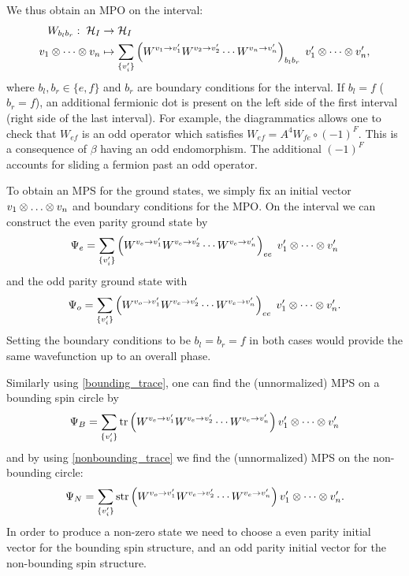 We thus obtain an MPO on the interval:
\begin{align}
W_{b_l b_r}: \; \mathcal{H}_I &\to \mathcal{H}_I\\
v_1 \otimes \cdots \otimes v_n& \mapsto  \sum_{\{v_i' \}} \left( W^{v_1 \rightarrow v_1'} W^{v_2 \rightarrow v_2'} \cdots W^{v_n \rightarrow v_n'} \right)_{b_l b_r} \; v_1' \otimes \cdots \otimes v_n' ,
\end{align}
where $b_l,b_r \in \{e,f\}$ and $b_r$ are boundary conditions for the interval.
If $b_l=f$ ($b_r=f$), an additional fermionic dot is present on the left side of the first interval (right side of the last interval). 
For example, the diagrammatics allows one to check that $W_{ef}$ is an odd operator which satisfies $W_{ef} = A^4 W_{fe} \circ (-1)^F$.
This is a consequence of $\beta$ having an odd endomorphism.
The additional $(-1)^F$ accounts for sliding a fermion past an odd operator.

To obtain an MPS for the ground states, we simply fix an initial vector $v_1\tp \dots \tp v_n$ and boundary conditions for the MPO. 
On the interval we can construct the even parity ground state by
\begin{align}
\Psi_{e} = \sum_{\{v_i' \}} \left( W^{v_e \rightarrow v_1'} W^{v_e \rightarrow v_2'} \cdots W^{v_e \rightarrow v_n'} \right)_{ee} \; v_1' \otimes \cdots \otimes v_n' 
\end{align} 
and the odd parity ground state with
\begin{align}
\Psi_{o} = \sum_{\{v_i' \}} \left( W^{v_o \rightarrow v_1'} W^{v_e \rightarrow v_2'} \cdots W^{v_e \rightarrow v_n'} \right)_{ee} \; v_1' \otimes \cdots \otimes v_n'.
\end{align} 
Setting the boundary conditions to be $b_l=b_r=f$ in both cases would provide the same wavefunction up to an overall phase.

Similarly using \eqref{bounding_trace}, one can find the (unnormalized) MPS on a bounding spin circle by
\begin{align} 
\Psi_B = \sum_{\{ v_i ' \} } \text{tr} \left( W^{v_e \rightarrow v_1'} W^{v_e \rightarrow v_2'} \cdots W^{v_e \rightarrow v_n'} \right) v_1' \otimes \cdots \otimes v_n' 
\end{align}
and by using \eqref{nonbounding_trace} we find the (unnormalized) MPS on the non-bounding circle:
\begin{align} 
\Psi_N = \sum_{\{ v_i ' \} } \text{str} \left( W^{v_o \rightarrow v_1'} W^{v_e \rightarrow v_2'} \cdots W^{v_e \rightarrow v_n'} \right) v_1' \otimes \cdots \otimes v_n'.
\end{align}
In order to produce a non-zero state we need to choose a even parity initial vector for the bounding spin structure, 
and an odd parity initial vector for the non-bounding spin structure. 

